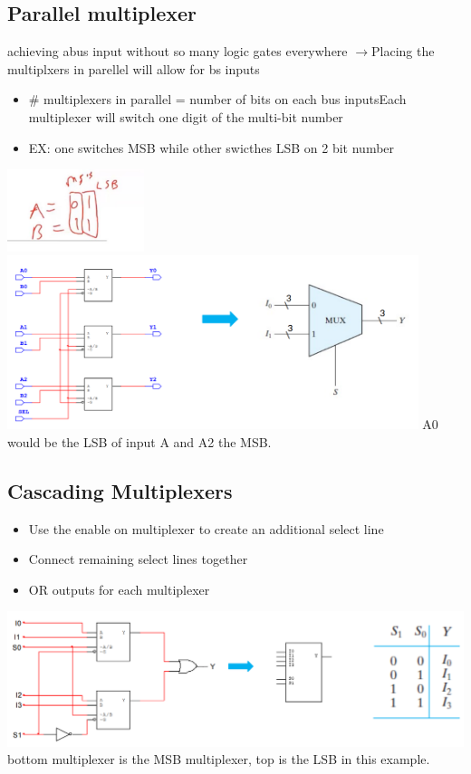 \documentclass[a4paper,12pt]{article}
\newcommand{\ra}{$\rightarrow$}
\begin{document}
            \subsection{Parallel multiplexer}
                achieving  abus input without so many logic gates everywhere \ra Placing the multiplxers in parellel will allow for bs inputs
                \begin{itemize}
                    \item \# multiplexers in parallel = number of bits on each bus inputsEach multiplexer will switch one digit of the multi-bit number
                    \item EX: one switches MSB while other swicthes LSB on 2 bit number
                \end{itemize}
                \includegraphics[width=4cm]{diagramforParallelmult.jpeg}
                \includegraphics*[width=12cm]{parallelMult.png}
                A0 would be the LSB of input A and A2 the MSB.

                \subsection{Cascading Multiplexers}
                    \begin{itemize}
                        \item Use the enable on multiplexer to create an additional select line
                        \item Connect remaining select lines together
                        \item OR outputs for each multiplexer
                    \end{itemize}
                    \includegraphics[width=16cm]{cascadeMult.png}\\
                    bottom multiplexer is the MSB multiplexer, top is the LSB in this example.
                    
\end{document}

